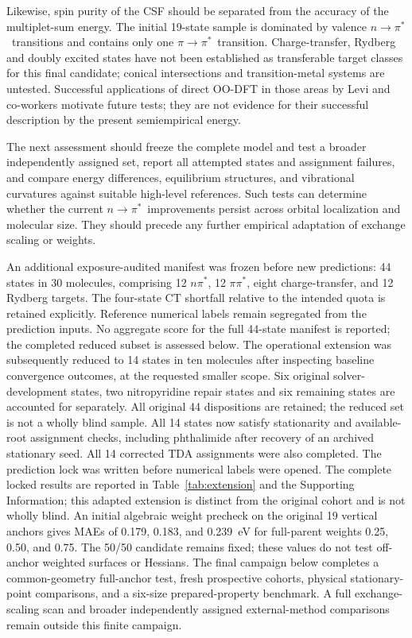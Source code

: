 \documentclass[11pt,a4paper]{article}
\newcommand{\npi}{\ensuremath{n\!\rightarrow\!\pi^*}}
\newcommand{\pipi}{\ensuremath{\pi\!\rightarrow\!\pi^*}}
\begin{document}
Likewise, spin purity of the CSF should be separated from the accuracy of the multiplet-sum energy. The initial 19-state sample is dominated by valence \npi\ transitions and contains only one \pipi\ transition. Charge-transfer, Rydberg and doubly excited states have not been established as transferable target classes for this final candidate; conical intersections and transition-metal systems are untested. Successful applications of direct OO-DFT in those areas by Levi and co-workers motivate future tests; they are not evidence for their successful description by the present semiempirical energy.

The next assessment should freeze the complete model and test a broader independently assigned set, report all attempted states and assignment failures, and compare energy differences, equilibrium structures, and vibrational curvatures against suitable high-level references. Such tests can determine whether the current \npi\ improvements persist across orbital localization and molecular size. They should precede any further empirical adaptation of exchange scaling or weights.

An additional exposure-audited manifest was frozen before new predictions: 44 states in 30 molecules, comprising 12 $n\pi^*$, 12 $\pi\pi^*$, eight charge-transfer, and 12 Rydberg targets. The four-state CT shortfall relative to the intended quota is retained explicitly. Reference numerical labels remain segregated from the prediction inputs. No aggregate score for the full 44-state manifest is reported; the completed reduced subset is assessed below. The operational extension was subsequently reduced to 14 states in ten molecules after inspecting baseline convergence outcomes, at the requested smaller scope. Six original solver-development states, two nitropyridine repair states and six remaining states are accounted for separately. All original 44 dispositions are retained; the reduced set is not a wholly blind sample. All 14 states now satisfy stationarity and available-root assignment checks, including phthalimide after recovery of an archived stationary seed. All 14 corrected TDA assignments were also completed. The prediction lock was written before numerical labels were opened. The complete locked results are reported in Table~\ref{tab:extension} and the Supporting Information; this adapted extension is distinct from the original cohort and is not wholly blind. An initial algebraic weight precheck on the original 19 vertical anchors gives MAEs of 0.179, 0.183, and 0.239~eV for full-parent weights 0.25, 0.50, and 0.75. The 50/50 candidate remains fixed; these values do not test off-anchor weighted surfaces or Hessians. The final campaign below completes a common-geometry full-anchor test, fresh prospective cohorts, physical stationary-point comparisons, and a six-size prepared-property benchmark. A full exchange-scaling scan and broader independently assigned external-method comparisons remain outside this finite campaign.
\end{document}
